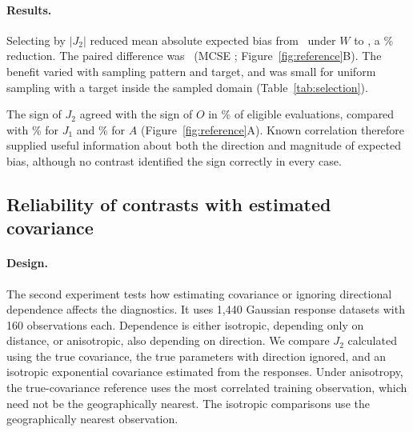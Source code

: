 \paragraph{Results.}
Selecting by $|J_2|$ reduced mean absolute expected bias from \BiasW\ under $W$ to \BiasJTwo, a \BiasReduction\% reduction. The paired difference was \BiasDelta\ (MCSE \BiasDeltaSE; Figure~\ref{fig:reference}B). The benefit varied with sampling pattern and target, and was small for uniform sampling with a target inside the sampled domain (Table~\ref{tab:selection}).

The sign of $J_2$ agreed with the sign of $O$ in \SignJTwo\% of eligible evaluations, compared with \SignJOne\% for $J_1$ and \SignA\% for $A$ (Figure~\ref{fig:reference}A). Known correlation therefore supplied useful information about both the direction and magnitude of expected bias, although no contrast identified the sign correctly in every case.

\begin{table}[!htbp]
\centering\small
\caption{Mean absolute expected bias, $|O|$, after scheme selection with known covariance. Smaller values mean that expected CV MSE is closer to the prediction MSE at the target locations. Each row averages 1,280 location configurations. Best of four averages the smallest true $|O|$ among the four candidates in each configuration. Fixed kNNDM uses kNNDM for every configuration. The last column is the paired difference for selection by $|J_2|$ minus selection by $W$, with its MCSE; negative values favour $|J_2|$.}
\label{tab:selection}
\setlength{\tabcolsep}{4pt}

\end{table}

\subsection{Reliability of contrasts with estimated covariance}
\label{sec:sim-covariance}
\paragraph{Design.}
The second experiment tests how estimating covariance or ignoring directional dependence affects the diagnostics. It uses 1,440 Gaussian response datasets with 160 observations each. Dependence is either isotropic, depending only on distance, or anisotropic, also depending on direction. We compare $J_2$ calculated using the true covariance, the true parameters with direction ignored, and an isotropic exponential covariance estimated from the responses. Under anisotropy, the true-covariance reference uses the most correlated training observation, which need not be the geographically nearest. The isotropic comparisons use the geographically nearest observation.


